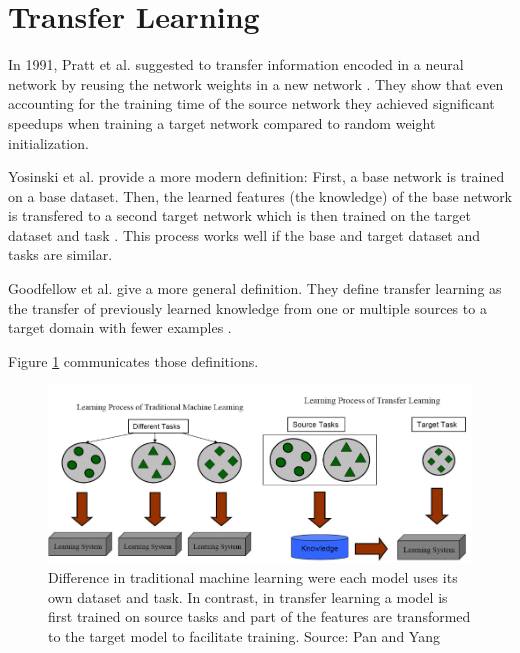 \section{Transfer Learning}
\label{sec:TransferLearning}

In 1991, Pratt et al. suggested to transfer information encoded in a neural network by reusing the network weights in a new network \cite{Pratt1991}. They show that even accounting for the training time of the source network they achieved significant speedups when training a target network compared to random weight initialization.

Yosinski et al. provide a more modern definition: First, a base network is trained on a base dataset. Then, the learned features {(the knowledge)} of the base network is transfered to a second target network which is then trained on the target dataset and task \cite{Yosinski2014}. This process works well if the base and target dataset and tasks are similar.

Goodfellow et al. give a more general definition. They define transfer learning as the transfer of previously learned knowledge from one or multiple sources to a target domain with fewer examples \cite{Goodfellow2016}.

Figure \ref{fig:03_transferLearning} communicates those definitions. 
\begin{figure}[ht]
	\centering
	\includegraphics[scale=0.55]{figures/03_theory/03_transferLearning}
	\caption{Difference in traditional machine learning were each model uses its own dataset and task. In contrast, in transfer learning a model is first trained on source tasks and part of the features are transformed to the target model to facilitate training. Source: Pan and Yang \cite{Pan2010}}
	\label{fig:03_transferLearning}
\end{figure}

